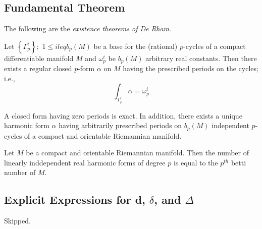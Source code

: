\subsection{Fundamental Theorem}

The following are the \textit{existence theorems of De Rham}.

\begin{thm}[R1]

	Let $ \left\{ \Gamma^i_p \right\}; \hspace{4pt} 1 \leq i leq b_p(M)$ be a base for the (rational) $p$-cycles of a compact differentiable manifold $M$ and $ \omega^i_p$ be $b_p(M)$ arbitrary real constants. Then there exists a regular closed $p$-form $ \alpha$ on $M$ having the prescribed periods on the cycles; i.e.,
	\[
		\int_{ \Gamma^i_p } \alpha = \omega^i_p
	\]
	

\end{thm}


\begin{thm}[R2]

	A closed form having zero periods is exact. In addition, there exists a unique harmonic form $ \alpha$ having arbitrarily prescribed periods on $b_p(M)$ independent $p$-cycles of a compact and orientable Riemannian manifold.

\end{thm}

\begin{thm}

Let $M$ be a compact and orientable Riemannian manifold. Then the number of linearly inddependent real harmonic forms of degree $p$ is equal to the $p^{ th }$ betti number of $M$.

\end{thm}


\subsection{Explicit Expressions for d, $ \delta$, and $ \Delta$}
Skipped.



























